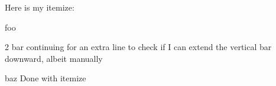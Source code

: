 \documentclass[12pt]{article}
\newcommand\rb[1]{\raisebox{-1.5pt}{%
  \stackunder[-2pt]{%
    \stackon[0pt]{%
      \stackinset{c}{}{c}{.35pt}{$\bullet$}{\scalebox{2}{$\circ$}}%
    }{%
      \smash{\rule{1pt}{2.1ex}}\kern.5pt}%
  }{%
    \smash{\rule[\dimexpr-#1\baselineskip+1.8ex\relax]{1pt}{%
      \dimexpr#1\baselineskip-1.8ex\relax}}\kern.5pt}%
  }%
}
\let\svitem\item
\def\rbsetup{\renewcommand\item[1][1]{\svitem[\rb{##1}]}}
\newenvironment{rbitemize}{\itemize\rbsetup}{\enditemize}
\begin{document}
\noindent Here is my itemize:
\begin{rbitemize}
\item foo
\item[2] bar continuing for an extra line to check if I can extend the 
  vertical bar downward, albeit manually
\item baz
\end{rbitemize}
Done with itemize
\end{document}
